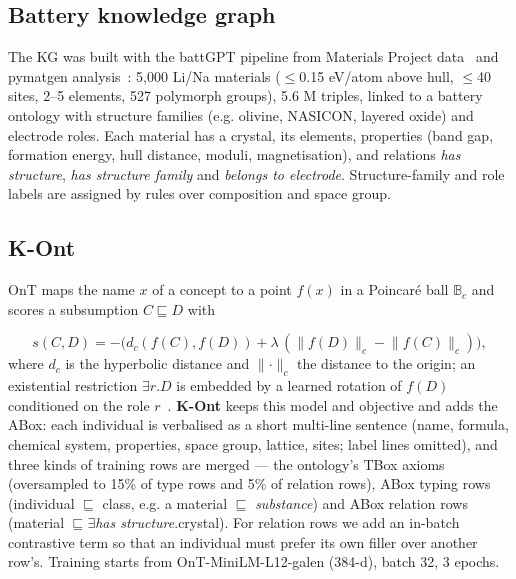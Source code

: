 \documentclass[conference]{IEEEtran}
\begin{document}
\subsection{Battery knowledge graph}
The KG was built with the battGPT pipeline from Materials Project data~\cite{jain2013mp} and pymatgen analysis~\cite{ong2013pymatgen}: 5,000 Li/Na materials ($\le$0.15 eV/atom above hull, $\le$40 sites, 2--5 elements, 527 polymorph groups), 5.6 M triples, linked to a battery ontology with structure families (e.g. olivine, NASICON, layered oxide) and electrode roles. Each material has a crystal, its elements, properties (band gap, formation energy, hull distance, moduli, magnetisation), and relations \emph{has structure}, \emph{has structure family} and \emph{belongs to electrode}. Structure-family and role labels are assigned by rules over composition and space group.

\subsection{K-Ont}
OnT maps the name $x$ of a concept to a point $f(x)$ in a Poincar\'e ball $\mathbb{B}_c$ and scores a subsumption $C \sqsubseteq D$ with

\begin{equation}s(C,D) = -\big(d_c(f(C),f(D)) + \lambda\,(\lVert f(D)\rVert_c - \lVert f(C)\rVert_c)\big),\end{equation}
where $d_c$ is the hyperbolic distance and $\lVert\cdot\rVert_c$ the distance to the origin; an existential restriction $\exists r.D$ is embedded by a learned rotation of $f(D)$ conditioned on the role $r$~\cite{yang2025ont}. \textbf{K-Ont} keeps this model and objective and adds the ABox: each individual is verbalised as a short multi-line sentence (name, formula, chemical system, properties, space group, lattice, sites; label lines omitted), and three kinds of training rows are merged --- the ontology's TBox axioms (oversampled to 15\% of type rows and 5\% of relation rows), ABox typing rows (individual $\sqsubseteq$ class, e.g. a material $\sqsubseteq$ \emph{substance}) and ABox relation rows (material $\sqsubseteq \exists$\emph{has structure}.crystal). For relation rows we add an in-batch contrastive term so that an individual must prefer its own filler over another row's. Training starts from OnT-MiniLM-L12-galen (384-d), batch 32, 3 epochs.
\end{document}
